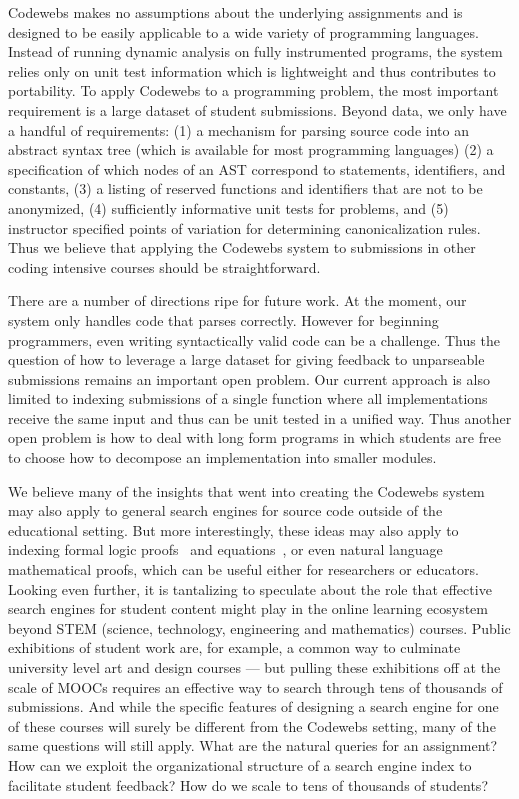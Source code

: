 Codewebs makes no assumptions about the underlying assignments and is designed to be easily applicable to a 
wide variety of programming languages.
Instead of running dynamic analysis on fully instrumented programs, the system relies only on unit test information
which is lightweight and thus contributes to portability.
To apply Codewebs to a programming problem, the most important requirement is a large dataset of student submissions.
Beyond data, we only have a handful of requirements:
(1) a mechanism for parsing source code into an abstract syntax tree (which is available for most programming languages)
(2) a specification of which nodes of an AST correspond to statements, identifiers, and constants, 
(3) a listing of reserved functions and identifiers that are not to be anonymized, 
(4) sufficiently informative unit tests for problems, and 
(5) instructor specified points of variation for determining canonicalization rules.  
Thus we believe that applying the Codewebs system to submissions in other coding intensive courses should be straightforward.

There are a number of directions ripe for future work.
At the moment, our system only handles code that parses correctly.  However for beginning programmers,
even writing syntactically valid code can be a challenge.  Thus the question of how to leverage a large
dataset for giving feedback to unparseable submissions remains an important open problem.  
Our current approach is also limited to indexing submissions of a single function where all implementations receive
the same input and thus can be unit tested in a unified way.
Thus another open problem is how to deal with long form programs in which
students are free to choose how to decompose an implementation into smaller modules.

We believe  many of the insights that went into creating the Codewebs system
may also apply to general search engines for source code outside of the educational setting. 
But more interestingly, these ideas may also apply to indexing formal logic proofs~\cite{fast13} and equations~\cite{kohlhase06}, or even 
natural language mathematical proofs, which can be useful either for researchers or educators.
Looking even further, it is tantalizing to speculate about the role that effective search engines for student content
 might play in the online learning ecosystem beyond STEM (science, technology, engineering and mathematics) courses. 
Public exhibitions of student work are, for example, a common way to culminate university level art and design courses --- but 
pulling these exhibitions off at the scale of MOOCs requires an effective way to search through tens of thousands of submissions.
And while the specific features of designing a search engine for one of these courses will surely be different from the Codewebs
setting,  many of the same questions will still apply.  
What are the natural queries for an assignment?
How can we exploit the organizational structure of a search engine index to facilitate student feedback?
How do we scale to tens of thousands of students?

